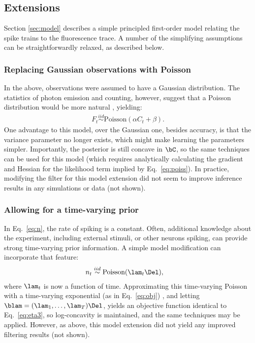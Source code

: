 \subsection{Extensions}

Section \ref{sec:model} describes a simple principled first-order model relating the spike trains to the fluorescence trace. A number of the simplifying assumptions can be straightforwardly relaxed, as described below.


\subsubsection{Replacing Gaussian observations with Poisson}

In the above, observations were assumed to have a Gaussian distribution.  The statistics of photon emission and counting, however, suggest that a Poisson distribution would be more natural \cite{SjulsonMiesenbock07}, yielding:
\begin{align} \label{eq:poiss}
	F_t \overset{iid}{\sim}\text{Poisson}(\alpha C_t + \beta).
\end{align}
One advantage to this model, over the Gaussian one, besides accuracy, is that the variance parameter no longer exists, which might make learning the parameters simpler.  Importantly, the posterior is still concave in $\bC$, so the same techniques can be used for this model (which requires analytically calculating the gradient and Hessian for the likelihood term implied by Eq.~\eqref{eq:poiss}).  In practice, modifying the filter for this model extension did not seem to improve inference results in any simulations or data (not shown).

\subsubsection{Allowing for a time-varying prior}

In Eq.~\eqref{eq:n}, the rate of spiking is a constant.  Often, additional knowledge about the experiment, including external stimuli, or other neurons spiking, can provide strong time-varying prior information.  A simple model modification can incorporate that feature:
\begin{align}
	n_t &\overset{iid}{\sim} \text{Poisson}(\lam_t \Del),
\end{align}
where $\lam_t$ is now a function of time.  Approximating this time-varying Poisson with a time-varying exponential (as in Eq.~\eqref{eq:obj}) , and letting $\blam = (\lam_1, \ldots, \lam_T) \Del$, yields an objective function identical to Eq.~\eqref{eq:eta3}, so log-concavity is maintained, and the same techniques may be applied.  However, as above, this model extension did not yield any improved filtering results (not shown).

